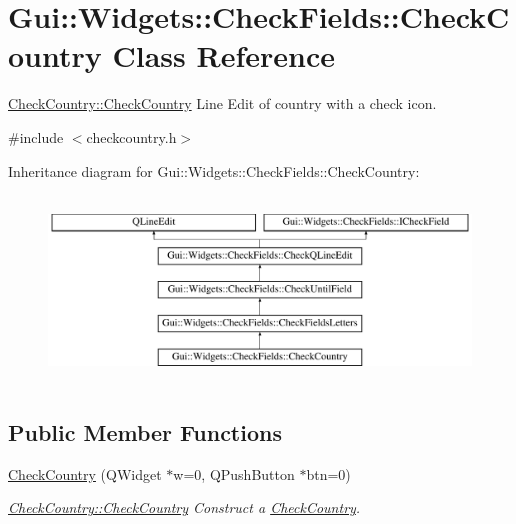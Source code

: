 \hypertarget{classGui_1_1Widgets_1_1CheckFields_1_1CheckCountry}{\section{Gui\-:\-:Widgets\-:\-:Check\-Fields\-:\-:Check\-Country Class Reference}
\label{classGui_1_1Widgets_1_1CheckFields_1_1CheckCountry}
}


\hyperlink{classGui_1_1Widgets_1_1CheckFields_1_1CheckCountry_ae432c47f8bede68b29a89af24b234eef}{Check\-Country\-::\-Check\-Country} Line Edit of country with a check icon.  




{\ttfamily \#include $<$checkcountry.\-h$>$}

Inheritance diagram for Gui\-:\-:Widgets\-:\-:Check\-Fields\-:\-:Check\-Country\-:\begin{figure}[H]
\begin{center}
\leavevmode
\includegraphics[height=5.000000cm]{d0/d3f/classGui_1_1Widgets_1_1CheckFields_1_1CheckCountry}
\end{center}
\end{figure}
\subsection*{Public Member Functions}
\begin{DoxyCompactItemize}
\item 
\hyperlink{classGui_1_1Widgets_1_1CheckFields_1_1CheckCountry_ae432c47f8bede68b29a89af24b234eef}{Check\-Country} (Q\-Widget $\ast$w=0, Q\-Push\-Button $\ast$btn=0)
\begin{DoxyCompactList}\small\item\em \hyperlink{classGui_1_1Widgets_1_1CheckFields_1_1CheckCountry_ae432c47f8bede68b29a89af24b234eef}{Check\-Country\-::\-Check\-Country} Construct a \hyperlink{classGui_1_1Widgets_1_1CheckFields_1_1CheckCountry}{Check\-Country}. \end{DoxyCompactList}\end{DoxyCompactItemize}
